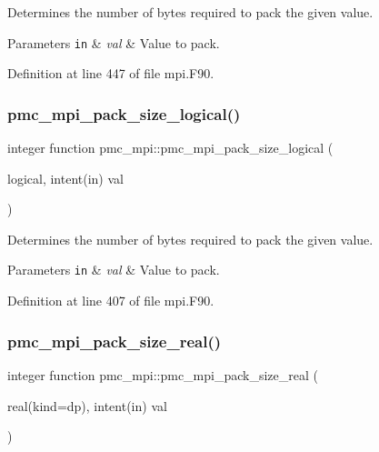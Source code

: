 Determines the number of bytes required to pack the given value. 


\begin{DoxyParams}[1]{Parameters}
\mbox{\tt in}  & {\em val} & Value to pack. \\
\hline
\end{DoxyParams}


Definition at line 447 of file mpi.\+F90.

\mbox{\label{namespacepmc__mpi_a679ca4ddcb8cd9747732378752108fda}} 
\subsubsection{\texorpdfstring{pmc\+\_\+mpi\+\_\+pack\+\_\+size\+\_\+logical()}{pmc\_mpi\_pack\_size\_logical()}}
{\footnotesize\ttfamily integer function pmc\+\_\+mpi\+::pmc\+\_\+mpi\+\_\+pack\+\_\+size\+\_\+logical (\begin{DoxyParamCaption}\item[{logical, intent(in)}]{val }\end{DoxyParamCaption})}



Determines the number of bytes required to pack the given value. 


\begin{DoxyParams}[1]{Parameters}
\mbox{\tt in}  & {\em val} & Value to pack. \\
\hline
\end{DoxyParams}


Definition at line 407 of file mpi.\+F90.

\mbox{\label{namespacepmc__mpi_a58c6890069ac044e640bb67211ef9b52}} 
\subsubsection{\texorpdfstring{pmc\+\_\+mpi\+\_\+pack\+\_\+size\+\_\+real()}{pmc\_mpi\_pack\_size\_real()}}
{\footnotesize\ttfamily integer function pmc\+\_\+mpi\+::pmc\+\_\+mpi\+\_\+pack\+\_\+size\+\_\+real (\begin{DoxyParamCaption}\item[{real(kind=dp), intent(in)}]{val }\end{DoxyParamCaption})}



